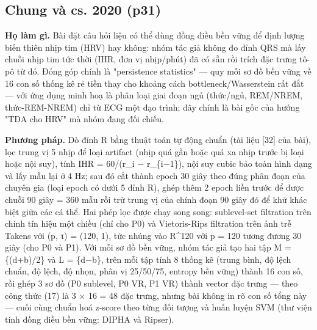 \documentclass[12pt,a4paper]{article}
\begin{document}
\subsection{Chung và cs. 2020 \normalfont\small (p31)}
\par\vspace{2pt}
\par\vspace{4pt}
\noindent \textbf{Họ làm gì.} Bài đặt câu hỏi liệu có thể dùng đồng điều bền vững để định lượng biến thiên nhịp tim (HRV) hay không: nhóm tác giả không đo đỉnh QRS mà lấy chuỗi nhịp tim tức thời (IHR, đơn vị nhịp/phút) đã có sẵn rồi trích đặc trưng tô-pô từ đó. Đóng góp chính là "persistence statistics" — quy mỗi sơ đồ bền vững về 16 con số thống kê rẻ tiền thay cho khoảng cách bottleneck/Wasserstein rất đắt — với ứng dụng minh hoạ là phân loại giai đoạn ngủ (thức/ngủ, REM/NREM, thức-REM-NREM) chỉ từ ECG một đạo trình; đây chính là bài gốc của hướng "TDA cho HRV" mà nhóm đang đối chiếu.\par\vspace{3pt}
\noindent \textbf{Phương pháp.} Dò đỉnh R bằng thuật toán tự động chuẩn (tài liệu [32] của bài), lọc trung vị 5 nhịp để loại artifact (nhịp quá gần hoặc quá xa nhịp trước bị loại hoặc nội suy), tính IHR = 60/(r\_i − r\_\{i−1\}), nội suy cubic bảo toàn hình dạng và lấy mẫu lại ở 4 Hz; sau đó cắt thành epoch 30 giây theo đúng phân đoạn của chuyên gia (loại epoch có dưới 5 đỉnh R), ghép thêm 2 epoch liền trước để được chuỗi 90 giây = 360 mẫu rồi trừ trung vị của chính đoạn 90 giây đó để khử khác biệt giữa các cá thể. Hai phép lọc được chạy song song: sublevel-set filtration trên chính tín hiệu một chiều (chỉ cho P0) và Vietoris-Rips filtration trên ảnh trễ Takens với (p, τ) = (120, 1), tức nhúng vào R\textasciicircum{}120 với p = 120 tương đương 30 giây (cho P0 và P1). Với mỗi sơ đồ bền vững, nhóm tác giả tạo hai tập M = \{(d+b)/2\} và L = \{d−b\}, trên mỗi tập tính 8 thống kê (trung bình, độ lệch chuẩn, độ lệch, độ nhọn, phân vị 25/50/75, entropy bền vững) thành 16 con số, rồi ghép 3 sơ đồ (P0 sublevel, P0 VR, P1 VR) thành vector đặc trưng — theo công thức (17) là 3 × 16 = 48 đặc trưng, nhưng bài không in rõ con số tổng này — cuối cùng chuẩn hoá z-score theo từng đối tượng và huấn luyện SVM (thư viện tính đồng điều bền vững: DIPHA và Ripser).\par\vspace{3pt}
\end{document}

